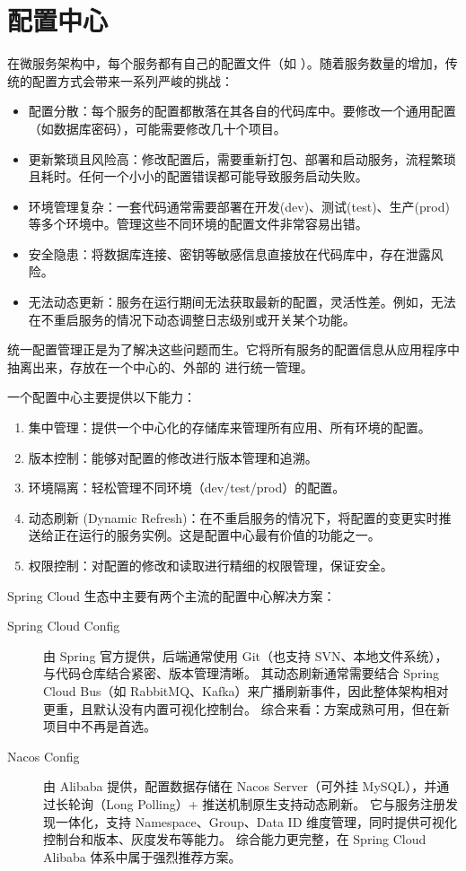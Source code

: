 \section{配置中心}
在微服务架构中，每个服务都有自己的配置文件（如 ）。随着服务数量的增加，传统的配置方式会带来一系列严峻的挑战：
\begin{itemize}
    \item 配置分散：每个服务的配置都散落在其各自的代码库中。要修改一个通用配置（如数据库密码），可能需要修改几十个项目。
    \item 更新繁琐且风险高：修改配置后，需要重新打包、部署和启动服务，流程繁琐且耗时。任何一个小小的配置错误都可能导致服务启动失败。 
    \item 环境管理复杂：一套代码通常需要部署在开发(dev)、测试(test)、生产(prod)等多个环境中。管理这些不同环境的配置文件非常容易出错。
    \item 安全隐患：将数据库连接、密钥等敏感信息直接放在代码库中，存在泄露风险。
    \item 无法动态更新：服务在运行期间无法获取最新的配置，灵活性差。例如，无法在不重启服务的情况下动态调整日志级别或开关某个功能。
\end{itemize}

统一配置管理正是为了解决这些问题而生。它将所有服务的配置信息从应用程序中抽离出来，存放在一个中心的、外部的
进行统一管理。

一个配置中心主要提供以下能力：

\begin{enumerate}
    \item 集中管理：提供一个中心化的存储库来管理所有应用、所有环境的配置。 
    \item 版本控制：能够对配置的修改进行版本管理和追溯。
    \item 环境隔离：轻松管理不同环境（dev/test/prod）的配置。
    \item 动态刷新 (Dynamic Refresh)：在不重启服务的情况下，将配置的变更实时推送给正在运行的服务实例。这是配置中心最有价值的功能之一。
    \item 权限控制：对配置的修改和读取进行精细的权限管理，保证安全。
\end{enumerate}

Spring Cloud 生态中主要有两个主流的配置中心解决方案：

\begin{description}
    \item[Spring Cloud Config] 由 Spring 官方提供，后端通常使用 Git（也支持 SVN、本地文件系统），与代码仓库结合紧密、版本管理清晰。
        其动态刷新通常需要结合 Spring Cloud Bus（如 RabbitMQ、Kafka）来广播刷新事件，因此整体架构相对更重，且默认没有内置可视化控制台。
        综合来看：方案成熟可用，但在新项目中不再是首选。
    \item[Nacos Config] 由 Alibaba 提供，配置数据存储在 Nacos Server（可外挂 MySQL），并通过长轮询（Long Polling）+ 推送机制原生支持动态刷新。
        它与服务注册发现一体化，支持 Namespace、Group、Data ID 维度管理，同时提供可视化控制台和版本、灰度发布等能力。
        综合能力更完整，在 Spring Cloud Alibaba 体系中属于强烈推荐方案。
\end{description}

